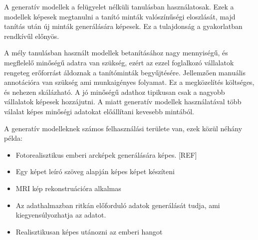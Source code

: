 A generatív modellek a felügyelet nélküli tanulásban használatosak. Ezek a modellek képesek megtanulni a tanító minták valószínűségi eloszlását, majd tanítás után új minták generálására képesek. Ez a tulajdonság a gyakorlatban rendkívűl előnyös. 

A mély tanulásban használt modellek betanításához nagy mennyiségű, és megflelelő minőségű adatra van szükség, ezért az ezzel foglalkozó vállalatok rengeteg erőforrást áldoznak a tanítóminták begyűjtésére. Jellemzően manuális annotációra van szükség ami munkaigényes folyamat. Ez a megközelítés költséges, és nehezen skálázható. A jó minőségű adathoz tipikusan csak a nagyobb vállalatok képesek hozzájutni. A miatt generatív modellek használatával több válalat képes minőségi adatokat előállítani kevesebb mintából.

A generatív modelleknek számos felhasználási területe van, ezek közül néhány példa:
\begin{itemize} 
	\item Fotorealisztikus emberi arcképek generálására képes. [REF]
	\item Egy képet leíró szöveg alapján képes képet készíteni
	\item MRI kép rekonstruációra alkalmas
	\item Az adathalmazban ritkán előforduló adatok generálását tudja, ami kiegyensúlyozhatja az adatot.
	\item Realisztikusan képes utánozni az emberi hangot
\end{itemize}





